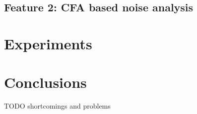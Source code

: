 \documentclass{template/acm_proc_article-sp}
\begin{document}
\subsection{Feature 2: CFA based noise analysis}

\section{Experiments}

\section{Conclusions}
TODO
shortcomings and problems



\end{document}
